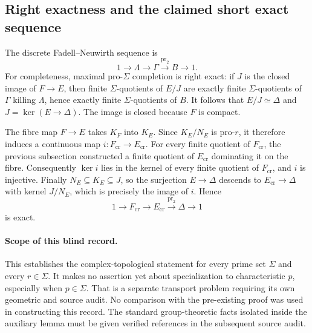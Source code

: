 \subsection{Right exactness and the claimed short exact sequence}

The discrete Fadell--Neuwirth sequence is
\[
 1\longrightarrow\Lambda\longrightarrow\Gamma
 \overset{\operatorname{pr}_2}{\longrightarrow} B\longrightarrow1.
\]
For completeness, maximal pro-$\Sigma$ completion is right exact:
if $J$ is the closed image of $F\to E$, then finite $\Sigma$-quotients
of $E/J$ are exactly finite $\Sigma$-quotients of $\Gamma$ killing
$\Lambda$, hence exactly finite $\Sigma$-quotients of $B$.
It follows that $E/J\simeq\Delta$ and
$J=\ker(E\to\Delta)$. The image is closed because $F$ is compact.

The fibre map $F\to E$ takes $K_F$ into $K_E$.
Since $K_E/N_E$ is pro-$r$, it therefore induces a continuous map
$i:F_{\mathrm{cr}}\to E_{\mathrm{cr}}$.
For every finite quotient of $F_{\mathrm{cr}}$, the previous subsection
constructed a finite quotient of $E_{\mathrm{cr}}$ dominating it on
the fibre. Consequently $\ker i$ lies in the kernel of every finite
quotient of $F_{\mathrm{cr}}$, and $i$ is injective.
Finally $N_E\subseteq K_E\subseteq J$, so the surjection
$E\to\Delta$ descends to $E_{\mathrm{cr}}\to\Delta$ with kernel
$J/N_E$, which is precisely the image of $i$. Hence
\[
 \boxed{\quad1\longrightarrow F_{\mathrm{cr}}
 \longrightarrow E_{\mathrm{cr}}
 \overset{\operatorname{pr}_2}{\longrightarrow}\Delta
 \longrightarrow1\quad}
\]
is exact.

\paragraph{Scope of this blind record.}
This establishes the complex-topological statement for every prime set
$\Sigma$ and every $r\in\Sigma$. It makes no assertion yet about
specialization to characteristic $p$, especially when $p\in\Sigma$.
That is a separate transport problem requiring its own geometric and
source audit. No comparison with the pre-existing proof was used in
constructing this record. The standard group-theoretic facts isolated
inside the auxiliary lemma must be given verified references in the
subsequent source audit.
